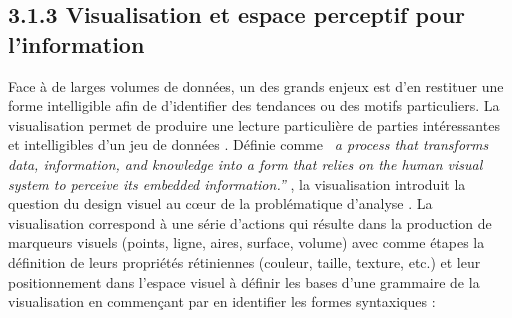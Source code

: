\subsection[Visualisation et espace perceptif pour l{\textquoteright}information]{3.1.3 Visualisation et espace perceptif pour l{\textquoteright}information}
Face \`a de larges volumes de donn\'ees, un des grands enjeux est
d{\textquoteright}en restituer une forme intelligible afin de
d{\textquoteright}identifier des tendances ou des motifs particuliers.
La visualisation permet de produire une lecture particuli\`ere de
parties int\'eressantes et intelligibles d{\textquoteright}un jeu de
donn\'ees \cite{Cairo2013}. D\'efinie comme \textit{{\guillemotleft}~a
process that transforms data, information, and knowledge into a form
that relies on the human visual system to perceive its embedded
information.{\textquotedblright}} \cite{Graffieti2010}, la
visualisation introduit la question du design visuel au c{\oe}ur de la
probl\'ematique d{\textquoteright}analyse \cite{Wesolowsky1992}.
La visualisation correspond \`a une s\'erie d{\textquoteright}actions
qui r\'esulte dans la production de marqueurs visuels (points, ligne,
aires, surface, volume) avec comme \'etapes la d\'efinition de leurs
propri\'et\'es r\'etiniennes (couleur, taille, texture, etc.) et leur
positionnement dans l{\textquoteright}espace visuel \cite{Card Mackinlay}
 \`a d\'efinir les bases d{\textquoteright}une grammaire de la
visualisation en commen\c{c}ant par en identifier les formes
syntaxiques : 

